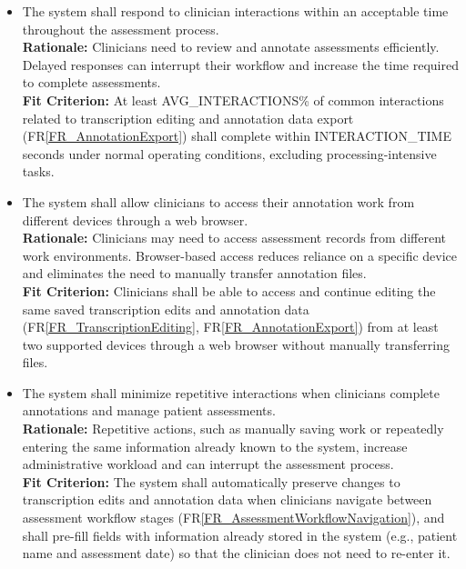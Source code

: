 \documentclass[12pt]{article}
\newcommand{\rref}[1]{FR\ref{#1}}
\newcounter{nfrnum} %
\newcommand{\rthenfrnum}{NFR\thenfrnum}
\begin{document}
\noindent \begin{itemize}

\item[\textbf{\rthenfrnum}:]
\label{NFR-CV1}
The system shall respond to clinician interactions within an acceptable time throughout the assessment process.
  \\ \textbf{Rationale:} Clinicians need to review and annotate assessments efficiently. Delayed responses can interrupt their workflow and increase the time required to complete assessments.
  \\ \textbf{Fit Criterion:} At least AVG\_INTERACTIONS\% of common interactions related to transcription editing and annotation data export (\rref{FR_AnnotationExport}) shall complete within INTERACTION\_TIME seconds under normal operating conditions, excluding processing-intensive tasks.

\item[\textbf{\rthenfrnum}:]
\label{NFR-CV2}
The system shall allow clinicians to access their annotation work from different devices through a web browser.
  \\ \textbf{Rationale:} Clinicians may need to access assessment records from different work environments. Browser-based access reduces reliance on a specific device and eliminates the need to manually transfer annotation files.
  \\ \textbf{Fit Criterion:} Clinicians shall be able to access and continue editing the same saved transcription edits and annotation data (\rref{FR_TranscriptionEditing}, \rref{FR_AnnotationExport}) from at least two supported devices through a web browser without manually transferring files.

\item[\textbf{\rthenfrnum}:]
\label{NFR-CV3}
The system shall minimize repetitive interactions when clinicians complete annotations and manage patient assessments.
  \\ \textbf{Rationale:} Repetitive actions, such as manually saving work or repeatedly entering the same information already known to the system, increase administrative workload and can interrupt the assessment process.
  \\ \textbf{Fit Criterion:} The system shall automatically preserve changes to transcription edits and annotation data when clinicians navigate between assessment workflow stages (\rref{FR_AssessmentWorkflowNavigation}), and shall pre-fill fields with information already stored in the system (e.g., patient name and assessment date) so that the clinician does not need to re-enter it.

\end{itemize}
\end{document}
